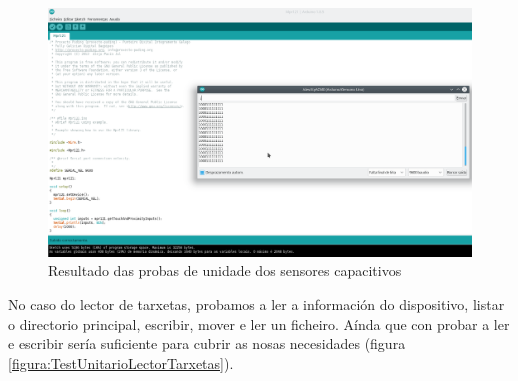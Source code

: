   \begin{figure}[htbp]
   \centering
   \includegraphics[scale=0.8,keepaspectratio=true]{./imagenes/resultado-test-sensores-capacitivos.png}
   \caption{Resultado das probas de unidade dos sensores capacitivos}
   \label{figura:ResultadoTestUnitarioSensoresCapacitivos}
  \end{figure}
  
  No caso do lector de tarxetas, probamos a ler a información do dispositivo,
  listar o directorio principal, escribir, mover e ler un ficheiro. Aínda que
  con probar a ler e escribir sería suficiente para cubrir as nosas necesidades
  (figura \ref{figura:TestUnitarioLectorTarxetas}). \\
  
